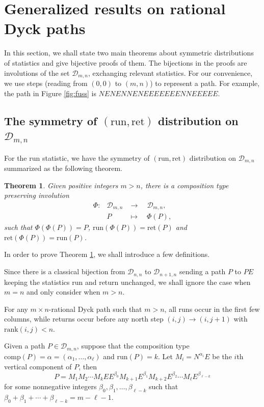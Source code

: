 \documentclass[11pt,a4paper,reqno]{article}
\newtheorem{thm}{Theorem}[section]
\newcommand{\tref}[1]{Theorem \ref{theorem:#1}}
\newcommand{\fref}[1]{Figure \ref{fig:#1}}
\newcommand{\DD}{\mathcal{D}}
\newcommand{\run}{\mathrm{run}}
\newcommand{\ret}{\mathrm{ret}}
\newcommand{\al}{\alpha}
\newcommand{\comp}{\mathrm{comp}}
\newcommand{\rank}{\mathrm{rank}}
\begin{document}
{	\section{Generalized results on rational Dyck paths}\label{involution}
	
	In this section, we shall state two main theorems about symmetric distributions of statistics and give bijective proofs of them. The bijections in the proofs are involutions of the set $\DD_{m,n}$, exchanging relevant statistics. For our convenience, we use steps (reading from $(0,0)$ to $(m,n)$) to represent a path. For example, the path in \fref{fuss} is $NENENNENEEEEEEENNEEEEE$.
	
	\subsection{\texorpdfstring{The symmetry of $(\run,\ret)$ distribution on $\DD_{m,n}$}{The symmetry of (run,ret) distribution on Dmn}}\label{run-ret}
	{ 
    For the run statistic, we have the symmetry of $(\run,\ret)$ distribution on $\DD_{m,n}$ summarized as the following theorem.
    
    \begin{thm}\label{theorem:run}
    		Given positive integers $m>n$, there is a composition type preserving involution
		\begin{eqnarray*}
			\Phi:& \DD_{m,n} &\longrightarrow \quad\DD_{m,n},\\
			&P &\longmapsto  \quad\Phi(P),
		\end{eqnarray*}
		such that $\Phi(\Phi(P))=P$, $\run(\Phi(P))=\ret(P)$ and $\ret(\Phi(P))=\run(P)$.
		
	\end{thm}}
	
	In order to prove \tref{run}, we shall introduce a few definitions. 
	
	Since there is a classical bijection from $\DD_{n,n}$ to $\DD_{n+1,n}$ sending a path $P$ to $PE$ keeping the statistics run and return unchanged, we shall ignore the case when $m=n$ and only consider when $m>n$.
	
	For any $m\times n$-rational Dyck path such that $m> n$, all runs  occur in the first few columns, while returns occur before {any north step $(i,j)\to (i,j+1)$ with $\rank(i,j)<n$.} 
	
	Given a path $P\in\DD_{m,n}$, suppose that the composition type $\comp(P)=\al=(\al_1,\ldots,\al_\ell)$ and $\run(P)=k$. Let $M_i = N^{\al_i} E$ be the $i$th vertical component of $P$, then 
	$$P=M_1M_2\cdots M_k E E^{\beta_0} M_{k+1} E^{\beta_1} M_{k+2} E^{\beta_2}\cdots M_{\ell} E^{\beta_{\ell-k}}$$
	for some nonnegative integers $\beta_0,\beta_1,\ldots,\beta_{\ell-k}$ such that $\beta_0+\beta_1+\cdots+\beta_{\ell-k} = m-\ell-1$.
	
}
\end{document}
